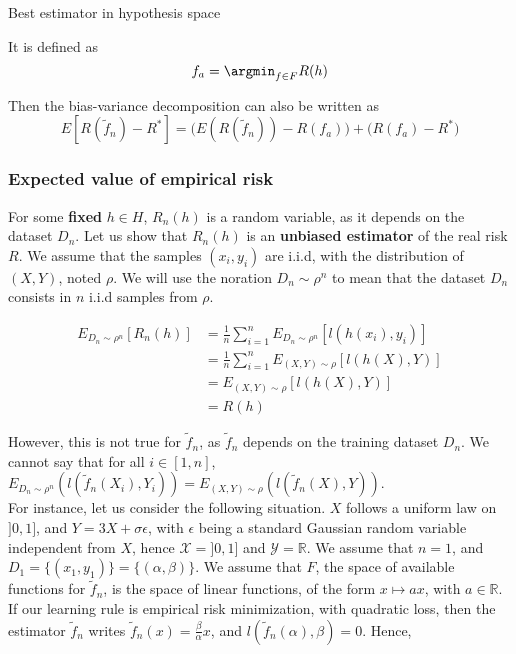 \documentclass[
10pt, %
a4paper, %
oneside, %
headinclude,footinclude, %
BCOR5mm, %
]{scrartcl}
\begin{document}
\begin{remark}

\begin{definition}{Best estimator in hypothesis space}

    It is defined as
    \begin{equation*}
	f_a = \argmin_{f\in F}R(h)
    \end{equation*}
\end{definition}

    Then the bias-variance decomposition can also be written as
\begin{equation*}
    E[R( \tilde{f}_n)-R^*] = \Big(E(R( \tilde{f}_n))- R(f_a)\Big) +\Big(R(f_a)-R^* \Big)
\end{equation*}
\end{remark}

\subsubsection{\large\color{Periwinkle}Expected value of empirical risk}

For some \textbf{{fixed}} $h\in H$, $R_n(h)$ is a random variable, as it depends on the dataset $D_n$. Let us show that $ R_n(h)$ is an \textbf{{unbiased estimator}} of the real risk $R$. We assume that the samples $(x_i, y_i)$ are i.i.d, with the distribution of $(X,Y)$, noted $\rho$. We will use the noration $D_n\sim \rho^n$ to mean that the dataset $D_n$ consists in $n$ i.i.d samples from $\rho$.

    \begin{equation*}
	    \begin{aligned}
		E_{D_n\sim \rho^n}[R_n(h)] &= \frac{1}{n} \sum^{n}_{i=1} E_{D_n\sim \rho^n}[l(h(x_i), y_i)] \\
		&= \frac{1}{n} \sum^{n}_{i=1} E_{(X,Y)\sim \rho}[l(h(X), Y)] \\
		&=  E_{(X,Y)\sim \rho}[l(h(X), Y)] \\
		&= R(h)
	    \end{aligned}
    \end{equation*}

    However, this is not true for $ \tilde{f}_n$, as $ \tilde{f}_n$ depends on the training dataset $ D_n$. We cannot say that for all $i\in [1, n]$, $E_{D_n\sim \rho^n}(l( \tilde{f}_n(X_i), Y_i)) = E_{(X,Y)\sim\rho}(l( \tilde{f}_n(X), Y))$.
    \\

    For instance, let us consider the following situation. $X$ follows a uniform law on $]0, 1]$, and $Y=3X+\sigma\epsilon$, with $\epsilon$ being a standard Gaussian random variable independent from $X$, hence $ \mathcal{X} = ]0, 1]$ and $ \mathcal{Y} = \mathbb{R} $. We assume that $n=1$, and $D_1 = \{(x_1, y_1)\}=\{(\alpha, \beta)\}$. We assume that $F$, the space of available functions for $ \tilde{f}_n$, is the space of linear functions, of the form $ x\mapsto ax$, with $a\in \mathbb{R}$. If our learning rule is empirical risk minimization, with quadratic loss, then the estimator $ \tilde{f}_n$ writes $ \tilde{f}_n(x)= \frac{\beta}{\alpha}x$, and $l( \tilde{f}_n(\alpha), \beta)=0$. Hence,
\end{document}
